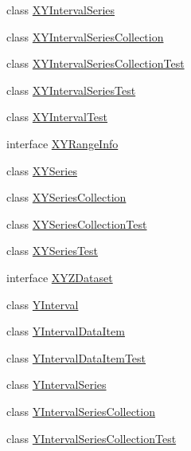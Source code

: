 \begin{DoxyCompactItemize}
\item 
class \mbox{\hyperlink{classorg_1_1jfree_1_1data_1_1xy_1_1_x_y_interval_series}{X\+Y\+Interval\+Series}}
\item 
class \mbox{\hyperlink{classorg_1_1jfree_1_1data_1_1xy_1_1_x_y_interval_series_collection}{X\+Y\+Interval\+Series\+Collection}}
\item 
class \mbox{\hyperlink{classorg_1_1jfree_1_1data_1_1xy_1_1_x_y_interval_series_collection_test}{X\+Y\+Interval\+Series\+Collection\+Test}}
\item 
class \mbox{\hyperlink{classorg_1_1jfree_1_1data_1_1xy_1_1_x_y_interval_series_test}{X\+Y\+Interval\+Series\+Test}}
\item 
class \mbox{\hyperlink{classorg_1_1jfree_1_1data_1_1xy_1_1_x_y_interval_test}{X\+Y\+Interval\+Test}}
\item 
interface \mbox{\hyperlink{interfaceorg_1_1jfree_1_1data_1_1xy_1_1_x_y_range_info}{X\+Y\+Range\+Info}}
\item 
class \mbox{\hyperlink{classorg_1_1jfree_1_1data_1_1xy_1_1_x_y_series}{X\+Y\+Series}}
\item 
class \mbox{\hyperlink{classorg_1_1jfree_1_1data_1_1xy_1_1_x_y_series_collection}{X\+Y\+Series\+Collection}}
\item 
class \mbox{\hyperlink{classorg_1_1jfree_1_1data_1_1xy_1_1_x_y_series_collection_test}{X\+Y\+Series\+Collection\+Test}}
\item 
class \mbox{\hyperlink{classorg_1_1jfree_1_1data_1_1xy_1_1_x_y_series_test}{X\+Y\+Series\+Test}}
\item 
interface \mbox{\hyperlink{interfaceorg_1_1jfree_1_1data_1_1xy_1_1_x_y_z_dataset}{X\+Y\+Z\+Dataset}}
\item 
class \mbox{\hyperlink{classorg_1_1jfree_1_1data_1_1xy_1_1_y_interval}{Y\+Interval}}
\item 
class \mbox{\hyperlink{classorg_1_1jfree_1_1data_1_1xy_1_1_y_interval_data_item}{Y\+Interval\+Data\+Item}}
\item 
class \mbox{\hyperlink{classorg_1_1jfree_1_1data_1_1xy_1_1_y_interval_data_item_test}{Y\+Interval\+Data\+Item\+Test}}
\item 
class \mbox{\hyperlink{classorg_1_1jfree_1_1data_1_1xy_1_1_y_interval_series}{Y\+Interval\+Series}}
\item 
class \mbox{\hyperlink{classorg_1_1jfree_1_1data_1_1xy_1_1_y_interval_series_collection}{Y\+Interval\+Series\+Collection}}
\item 
class \mbox{\hyperlink{classorg_1_1jfree_1_1data_1_1xy_1_1_y_interval_series_collection_test}{Y\+Interval\+Series\+Collection\+Test}}

\end{DoxyCompactItemize}
